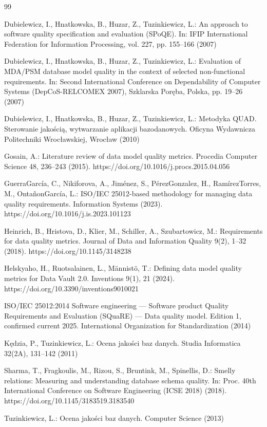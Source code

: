 \begin{thebibliography}{99}

Dubielewicz, I., Hnatkowska, B., Huzar, Z., Tuzinkiewicz, L.:
An approach to software quality specification and evaluation (SPoQE).
In: IFIP International Federation for Information Processing, vol. 227,
pp. 155--166 (2007)

Dubielewicz, I., Hnatkowska, B., Huzar, Z., Tuzinkiewicz, L.:
Evaluation of MDA/PSM database model quality in the context of selected non-functional requirements.
In: Second International Conference on Dependability of Computer Systems (DepCoS-RELCOMEX 2007),
Szklarska Poręba, Polska, pp. 19--26 (2007)

Dubielewicz, I., Hnatkowska, B., Huzar, Z., Tuzinkiewicz, L.:
Metodyka QUAD. Sterowanie jakością, wytwarzanie aplikacji bazodanowych.
Oficyna Wydawnicza Politechniki Wrocławskiej, Wrocław (2010)

Gosain, A.:
Literature review of data model quality metrics.
Procedia Computer Science 48, 236--243 (2015).
https://doi.org/10.1016/j.procs.2015.04.056

GuerraGarcía, C., Nikiforova, A., Jiménez, S., PérezGonzalez, H., RamírezTorres, M., OntañonGarcía, L.:
ISO/IEC 25012-based methodology for managing data quality requirements.
Information Systems (2023).
https://doi.org/10.1016/j.is.2023.101123

Heinrich, B., Hristova, D., Klier, M., Schiller, A., Szubartowicz, M.:
Requirements for data quality metrics.
Journal of Data and Information Quality 9(2), 1--32 (2018).
https://doi.org/10.1145/3148238

Helskyaho, H., Ruotsalainen, L., Männistö, T.:
Defining data model quality metrics for Data Vault 2.0.
Inventions 9(1), 21 (2024).
https://doi.org/10.3390/inventions9010021

ISO/IEC 25012:2014 Software engineering --- Software product Quality Requirements and Evaluation (SQuaRE) --- Data quality model.
Edition 1, confirmed current 2025.
International Organization for Standardization (2014)

Kędzia, P., Tuzinkiewicz, L.:
Ocena jakości baz danych.
Studia Informatica 32(2A), 131--142 (2011)

Sharma, T., Fragkoulis, M., Rizou, S., Bruntink, M., Spinellis, D.:
Smelly relations: Measuring and understanding database schema quality.
In: Proc. 40th International Conference on Software Engineering (ICSE 2018) (2018).
https://doi.org/10.1145/3183519.3183540

Tuzinkiewicz, L.:
Ocena jakości baz danych.
Computer Science (2013)



\end{thebibliography}


